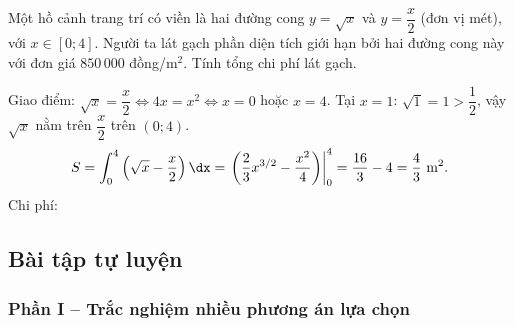 \begin{hopvidu}
Một hồ cảnh trang trí có viền là hai đường cong $y=\sqrt{x}$ và $y=\dfrac{x}{2}$ (đơn vị mét), với $x\in[0;4]$. Người ta lát gạch phần diện tích giới hạn bởi hai đường cong này với đơn giá $850\,000$ đồng/m$^2$. Tính tổng chi phí lát gạch.
\end{hopvidu}
\begin{loigiai}
Giao điểm: $\sqrt{x}=\dfrac{x}{2} \Leftrightarrow 4x=x^2 \Leftrightarrow x=0$ hoặc $x=4$. Tại $x=1$: $\sqrt1=1 > \dfrac12$, vậy $\sqrt{x}$ nằm trên $\dfrac{x}{2}$ trên $(0;4)$.
\[
S=\int_0^4\left(\sqrt x - \frac x2\right)\dx = \left.\left(\frac23 x^{3/2}-\frac{x^2}{4}\right)\right|_0^4 = \frac{16}{3}-4=\frac43 \text{ m}^2.
\]
Chi phí:
\end{loigiai}

\newpage
\subsection{Bài tập tự luyện}

\subsubsection*{Phần I -- Trắc nghiệm nhiều phương án lựa chọn}

